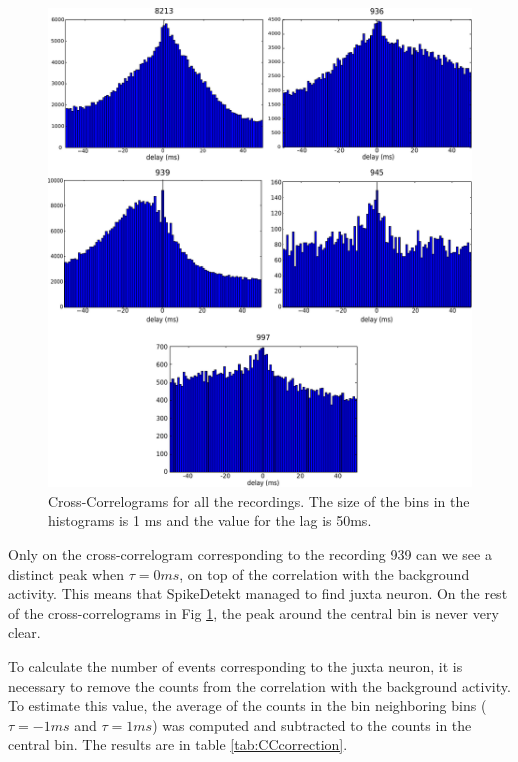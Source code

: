\documentclass[10pt]{article}
\begin{document}
\begin{figure}[!h]
	\centering
	\includegraphics[width=\linewidth]{2.Chapter/CC.pdf}
	\caption{Cross-Correlograms for all the recordings. The size of the bins in the histograms is 1 ms and the value for the lag is 50ms.
}
\label{fig:CC}
\end{figure}


Only on the cross-correlogram corresponding to the recording 939 can we see a distinct peak when $\tau=0 ms$, on top of the correlation with the background activity. This means that SpikeDetekt managed to find juxta neuron. On the rest of the cross-correlograms in Fig \ref{fig:CC}, the peak around the central bin is never very clear.

To calculate the number of events corresponding to the juxta neuron, it is necessary to remove the counts from the correlation with the background activity. To estimate this value, the average of the counts in the bin neighboring bins ($\tau = -1ms$ and $\tau = 1 ms$) was computed and subtracted to the counts in the central bin. The results are in table \ref{tab:CCcorrection}.
\end{document}
